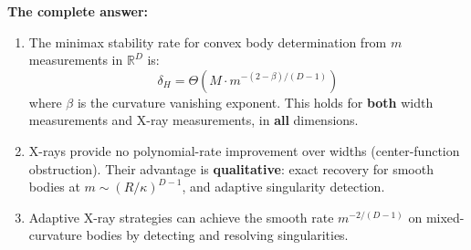 \textbf{The complete answer:}

\begin{enumerate}
  \item The minimax stability rate for convex body determination from $m$ measurements in $\mathbb{R}^D$ is:
  \[
    \boxed{\delta_H = \Theta\!\left(M \cdot m^{-(2-\beta)/(D-1)}\right)}
  \]
  where $\beta$ is the curvature vanishing exponent. This holds for \textbf{both} width measurements and X-ray measurements, in \textbf{all} dimensions.
  
  \item X-rays provide no polynomial-rate improvement over widths (center-function obstruction). Their advantage is \textbf{qualitative}: exact recovery for smooth bodies at $m \sim (R/\kappa)^{D-1}$, and adaptive singularity detection.
  
  \item Adaptive X-ray strategies can achieve the smooth rate $m^{-2/(D-1)}$ on mixed-curvature bodies by detecting and resolving singularities.
\end{enumerate}
